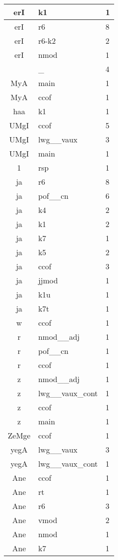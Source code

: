 \documentclass[a4 paper]{article}
\begin{document}
\begin{longtable}{cp{}p{}}
erI & k1 & 1\\ \midrule erI & r6 & 8\\ \midrule erI & r6-k2 & 2\\ \midrule erI & nmod & 1\\ \midrule 
	 & \_ & 4\\ \midrule 
MyA & main & 1\\ \midrule MyA & ccof & 1\\ \midrule 
haa & k1 & 1\\ \midrule 
UMgI & ccof & 5\\ \midrule UMgI & lwg\_\_vaux & 3\\ \midrule UMgI & main & 1\\ \midrule 
1 & rsp & 1\\ \midrule 
ja & r6 & 8\\ \midrule ja & pof\_\_cn & 6\\ \midrule ja & k4 & 2\\ \midrule ja & k1 & 2\\ \midrule ja & k7 & 1\\ \midrule ja & k5 & 2\\ \midrule ja & ccof & 3\\ \midrule ja & jjmod & 1\\ \midrule ja & k1u & 1\\ \midrule ja & k7t & 1\\ \midrule 
w & ccof & 1\\ \midrule 
r & nmod\_\_adj & 1\\ \midrule r & pof\_\_cn & 1\\ \midrule r & ccof & 1\\ \midrule 
z & nmod\_\_adj & 1\\ \midrule z & lwg\_\_vaux\_cont & 1\\ \midrule z & ccof & 1\\ \midrule z & main & 1\\ \midrule 
ZeMge & ccof & 1\\ \midrule 
yegA & lwg\_\_vaux & 3\\ \midrule yegA & lwg\_\_vaux\_cont & 1\\ \midrule 
Ane & ccof & 1\\ \midrule Ane & rt & 1\\ \midrule Ane & r6 & 3\\ \midrule Ane & vmod & 2\\ \midrule Ane & nmod & 1\\ \midrule Ane & k7 & 1\\ \midrule 

\end{longtable}
\end{document}
